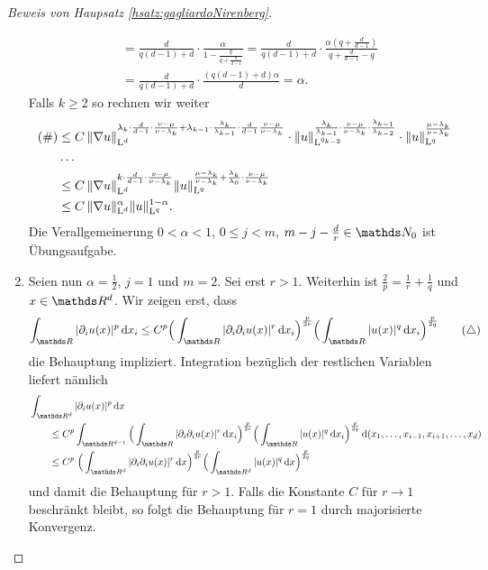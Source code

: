 \begin{proof}[Beweis von Haupsatz \ref{hsatz:gagliardoNirenberg}]
\begin{enumerate}
\begin{align*}
        &= \frac{d}{q(d - 1) + d} \cdot \frac{\alpha}{1 - \frac{q}{q + \frac{d}{d - 1}}} 
        = \frac{d}{q(d - 1) + d} \cdot \frac{\alpha (q + \frac{d}{d - 1})}{q + \frac{d}{d - 1} - q} \\
        &= \frac{d}{q(d - 1) + d} \cdot \frac{(q(d - 1) + d) \alpha}{d} 
        = \alpha.
      \end{align*}
      Falls $k \geq 2$ so rechnen wir weiter
      \begin{align*}
        (\#) 
        &\leq C\, \|\nabla u\|_{\mathrm{L}^d}^{\lambda_k \cdot \frac{d}{d - 1} \cdot \frac{\nu - \mu}{\nu - \lambda_k} + \lambda_{k - 1} \cdot \frac{\lambda_k}{\lambda_{k - 1}} \cdot \frac{d}{d - 1} \frac{\nu - \mu}{\nu - \lambda_k}}
        \cdot \| u\|_{\mathrm{L}^{q_{k - 2}}}^{\frac{\lambda_k}{\lambda_{k - 1}} \cdot \frac{\nu - \mu}{\nu - \lambda_k} \cdot \frac{\lambda_{k - 1}}{\lambda_{k - 2}}} 
        \cdot \|u\|_{\mathrm{L}^q}^{\frac{\mu - \lambda_k}{\nu - \lambda_k}} \\
        &\dots \\
        &\leq C \, \|\nabla u\|_{\mathrm{L}^d}^{k \cdot \frac{d}{d - 1} \cdot \frac{\nu - \mu}{\nu - \lambda_k}} \|u\|_{\mathrm{L}^q}^{\frac{\mu - \lambda_k}{\nu - \lambda_k} + \frac{\lambda_k}{\lambda_0} \cdot \frac{\nu - \mu}{\nu - \lambda_k}} \\
        &\leq C \, \|\nabla u\|_{\mathrm{L}^d}^{\alpha} \|u\|_{\mathrm{L}^q}^{1 - \alpha}.
      \end{align*}
      Die Verallgemeinerung $0 < \alpha < 1$, $0 \leq j < m$, $m - j - \frac{d}{r} \in \N_0$ ist Übungsaufgabe.
    \item
      Seien nun $\alpha = \frac{1}{2}$, $j = 1$ und $m = 2$.
      Sei erst $r > 1$.
      Weiterhin ist $\frac{2}{p} = \frac{1}{r} + \frac{1}{q}$ und $x \in \R^d$.
      Wir zeigen erst, dass
      \begin{align*}
        \int_{\R} |\partial_i u(x)|^p \d x_i 
        \leq C^p \Big( \int_{\R} |\partial_i \partial_i u(x)|^r \d x_i \Big)^{\frac{p}{2r}} \Big(\int_{\R} |u(x)|^q \d x_i \Big)^{\frac{p}{2q}}
        \tag{$\triangle$}
      \end{align*}
      die Behauptung impliziert.
      Integration bezüglich der restlichen Variablen liefert nämlich
      \begin{align*}
        &\int_{\R^d} |\partial_i u(x)|^p \d x \\
        &\qquad\leq C^p \int_{\R^{d - 1}} \Big( \int_{\R} |\partial_i \partial_i u(x)|^r \d x_i \Big)^{\frac{p}{2r}} \Big(\int_{\R} |u(x)|^q \d x_i \Big)^{\frac{p}{2q}} \d (x_1,\dots,x_{i - 1}, x_{i + 1}, \dots, x_d ) \\
        &\qquad\leq C^p \; \Big( \int_{\R^d} |\partial_i \partial_i u(x)|^r \d x \Big)^{\frac{p}{2r}} \Big( \int_{\R^d} |u(x)|^q \d x \Big)^{\frac{p}{2q}}
      \end{align*}
      und damit die Behauptung für $r > 1$.
      Falls die Konstante $C$ für $r \to 1$ beschränkt bleibt, so folgt die Behauptung für $r = 1$ durch majorisierte Konvergenz.


\end{enumerate}
\end{proof}
